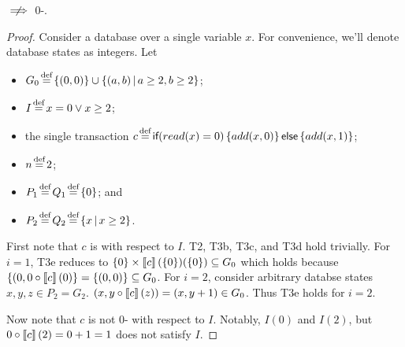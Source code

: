 \begin{claim}\label{clm:0-istrength-not-implies-0-isafety}
  \istrength{} $\centernot\implies$ 0-\isafety.
\end{claim}
\begin{proof}
  Consider a database over a single variable $x$. For convenience, we'll denote
  database states as integers. Let
  \begin{itemize}
    \item
      $G_0 \defeq \set{(0, 0)} \cup \setst{(a, b)}{a \geq 2, b \geq 2}$;
    \item
      $I \defeq x = 0 \lor x \geq 2$;
    \item
      the single \imp{} transaction $c \defeq
      \impif{read(x)=0}{add(x, 0)}{add(x, 1)}$;
    \item
      $n \defeq 2$;
    \item
      $P_1 \defeq Q_1 \defeq \set{0}$; and
    \item
      $P_2 \defeq Q_2 \defeq \setst{x}{x \geq 2}$.
  \end{itemize}

 First note that $c$ is \istrong{} with respect to $I$.  T2, T3b, T3c, and T3d
 hold trivially. For $i = 1$, T3e reduces to $\left\{0\right\} \times
 \left\llbracket c\right\rrbracket(\left\{0\right\})(\left\{0\right\}) \subseteq G_0$ which holds because $\left\{(0, 0
 \circ \left\llbracket c\right\rrbracket(0)\right\} = \left\{(0, 0)\right\} \subseteq G_0$. For $i = 2$, consider
 arbitrary databse states $x,y,z \in P_2 = G_2$. $(x, y \circ \left\llbracket c\right\rrbracket(z)) =
 (x, y + 1) \in G_0$. Thus T3e holds for $i = 2$.

  Now note that $c$ is not 0-\isafe{} with respect to $I$. Notably, $I(0)$ and
  $I(2)$, but $0 \circ \left\llbracket c\right\rrbracket(2) = 0 + 1 = 1$ does not satisfy $I$.
\end{proof}


